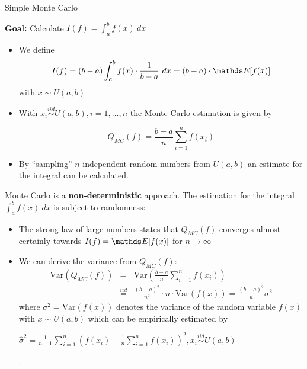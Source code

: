 










\begin{vbframe}{Simple Monte Carlo}

\textbf{Goal:} Calculate $I(f) = \int_a^b f(x)~dx$

\begin{itemize}
\item We define
$$
I(f) = (b - a)\int_a^b f(x)\cdot \frac{1}{b - a}~dx = (b - a)\cdot \E[f(x)]
$$
with $x \sim U(a, b)$
\item With $x_i \overset{iid}{\sim} U(a, b), i = 1, ..., n$ the Monte Carlo estimation is given by

$$
Q_{MC}(f) = \frac{b - a}{n} \sum_{i = 1}^n f(x_i)
$$
\item By \enquote{sampling} $n$ independent random numbers from $U(a,b)$ an estimate for the integral can be calculated.
\end{itemize}

\framebreak

Monte Carlo is a \textbf{non-deterministic} approach. The estimation for the integral $\int_a^b f(x) ~dx$ is subject to randomness:

\begin{itemize}
\item The strong law of large numbers states that $Q_{MC}(f)$ converges almost certainly towards $I(f) = \E[f(x)]$ for $n\to\infty$
\item We can derive the variance from $Q_{MC}(f)$:
\vspace*{-0.2cm}
\begin{eqnarray*}
\text{Var}\left(Q_{MC}(f)\right) &=& \text{Var}\left(\frac{b - a}{n} \sum_{i = 1}^n f(x_i)\right) \\
&\overset{iid}{=}& \frac{(b - a)^2}{n^2}\cdot n \cdot \text{Var}(f(x)) = \frac{(b - a)^2}{n} \sigma^2
\end{eqnarray*}
where $\sigma^2 = \text{Var}(f(x))$ denotes the variance of the random variable $f(x)$ with $x \sim U(a, b)$ which can be empirically estimated by \begin{footnotesize}$\hat \sigma^2 = \frac{1}{n - 1} \sum_{i = 1}^n \left(f(x_i) - \frac{1}{n}\sum_{i = 1}^n f(x_i)\right)^2, x_i \overset{iid}{\sim} U(a, b)$\end{footnotesize}.


\end{itemize}
\end{vbframe}
